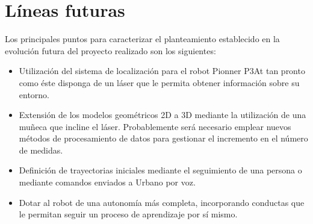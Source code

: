 \section{Líneas futuras}
Los principales puntos para caracterizar el planteamiento establecido en la evolución futura del proyecto realizado son los siguientes:

\begin{itemize}
  \item Utilización del sistema de localización para el robot Pionner P3At tan pronto como éste disponga de un láser que le permita obtener información sobre su entorno.
  \item Extensión de los modelos geométricos 2D a 3D mediante la utilización de una muñeca que incline el láser. Probablemente será necesario emplear nuevos métodos de procesamiento de datos para gestionar el incremento en
      el número de medidas.
  \item Definición de trayectorias iniciales mediante el seguimiento de una persona o mediante comandos enviados a Urbano por voz.
  \item Dotar al robot de una autonomía más completa, incorporando conductas que le permitan seguir un proceso de aprendizaje por sí mismo.
\end{itemize}

